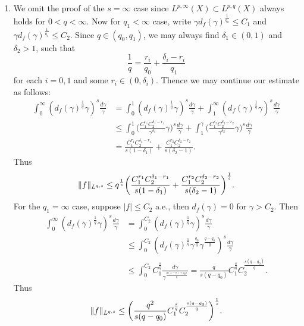 \begin{enumerate}
\item[1.4.2.]
   We omit the proof of the $s=\infty$ case 
   since $L^{p,\infty}(X) \subset L^{p,q}(X)$ always holds for $0<q<\infty$. 
   Now for $q_{1}<\infty$ case, write $\gamma d_{f}(\gamma)^{\frac{1}{q_{0}}} \leq C_{1}$ 
   and $\gamma d_{f}(\gamma)^{\frac{1}{q_{1}}} \leq C_{2}$. 
   Since $q \in (q_{0},q_{1})$, we may always find $\delta_{1} \in (0,1)$ and $\delta_{2}>1$, such that
   \[\frac{1}{q}=\frac{r_{i}}{q_{0}}+\frac{\delta_{i}-r_{i}}{q_{1}}\]
   for each $i=0,1$ and some $r_{i} \in (0,\delta_{i})$. Thence we may continue our estimate as follows:
   \begin{equation*}\begin{aligned}
   \int_{0}^{\infty}(d_{f}(\gamma)^{\frac{1}{q}}\gamma)^{s}\frac{d\gamma}{\gamma}
   &= \int_{0}^{1}(d_{f}(\gamma)^{\frac{1}{q}}\gamma)^{s}\frac{d\gamma}{\gamma} + \int_{1}^{\infty}(d_{f}(\gamma)^{\frac{1}{q}}\gamma)^{s}\frac{d\gamma}{\gamma}\\
   &\leq \int_{0}^{1}\bigg(\frac{C_{1}^{r_{1}}C_{2}^{\delta_{1}-r_{1}}}{\gamma^{\delta_{1}}}\gamma\bigg)^{s}\frac{d\gamma}{\gamma} 
   + \int_{1}^{\gamma}\bigg(\frac{C_{1}^{r_{2}}C_{2}^{\delta_{2}-r_{2}}}{\gamma^{\delta_{2}}}\gamma\bigg)^{s}\frac{d\gamma}{\gamma}\\
   &=\frac{C_{1}^{r_{1}}C_{2}^{\delta_{1}-r_{1}}}{s(1-\delta_{1})} + \frac{C_{1}^{r_{2}}C_{2}^{\delta_{2}-r_{2}}}{s(\delta_{2}-1)}.
   \end{aligned}\end{equation*}
   Thus
   \[\Vert f \Vert_{L^{q,s}} \leq q^{\frac{1}{s}}
   \bigg(\frac{C_{1}^{r_{1}}C_{2}^{\delta_{1}-r_{1}}}{s(1-\delta_{1})} 
   + \frac{C_{1}^{r_{2}}C_{2}^{\delta_{2}-r_{2}}}{s(\delta_{2}-1)}\bigg)^{\frac{1}{s}}.\]
   For the $q_{1} = \infty$ case, suppose $|f| \leq C_{2}$ a.e., 
   then $d_{f}(\gamma)=0$ for $\gamma > C_{2}$. Then
   \begin{equation*}\begin{aligned}
   \int_{0}^{\infty}(d_{f}(\gamma)^{\frac{1}{q}}\gamma)^{s}\frac{d\gamma}{\gamma}
   &= \int_{0}^{C_{2}}(d_{f}(\gamma)^{\frac{1}{q}}\gamma)^{s}\frac{d\gamma}{\gamma}
   \\&\leq \int_{0}^{C_{2}}(d_{f}(\gamma)^{\frac{1}{q}}\gamma^{\frac{q_{0}}{q}}\gamma^{\frac{q-q_{0}}{q}})^{s}\frac{d\gamma}{\gamma}
   \\&\leq \int_{0}^{C_{2}}C_{1}^{\frac{s}{q}}\frac{d\gamma}{\gamma^{\frac{q(1-s)+q_{0}s}{q}}}
   = \frac{q}{s(q-q_{0})}C_{1}^{\frac{s}{q}}C_{2}^{\frac{s(q-q_{0})}{q}}.
   \end{aligned}\end{equation*}
   Thus 
   \[\Vert f \Vert_{L^{q,s}} \leq \bigg(\frac{q^{2}}{s(q-q_{0})}C_{1}^{\frac{s}{q}}C_{2}^{\frac{s(q-q_{0})}{q}}\bigg)^{\frac{1}{s}}.\]


\end{enumerate}
